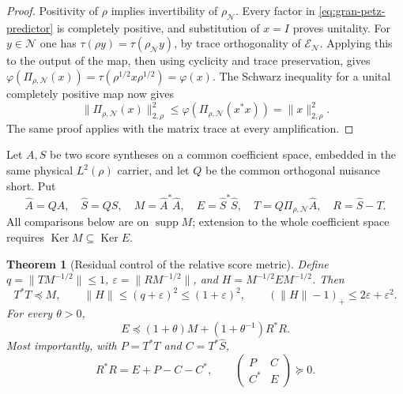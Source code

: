 \documentclass[11pt]{article}
\newtheorem{theorem}{Theorem}[section]
\theoremstyle{definition}
\theoremstyle{remark}
\newcommand{\C}{\mathbb C}
\newcommand{\Ker}{\operatorname{Ker}}
\newcommand{\supp}{\operatorname{supp}}
\begin{document}
\begin{proof}
Positivity of $\rho$ implies invertibility of
$\rho_{\mathcal N}$.  Every factor in
\eqref{eq:gran-petz-predictor} is completely positive, and substitution
of $x=I$ proves unitality.  For $y\in\mathcal N$ one has
$\tau(\rho y)=\tau(\rho_{\mathcal N}y)$, by trace orthogonality of
$\mathcal E_{\mathcal N}$.  Applying this to the output of the map,
then using cyclicity and trace preservation, gives
$\varphi(\Pi_{\rho,\mathcal N}(x))=\tau(\rho^{1/2}x\rho^{1/2})
=\varphi(x)$.
The Schwarz inequality for a unital completely positive map now gives
\[
 \|\Pi_{\rho,\mathcal N}(x)\|_{2,\rho}^2
 \le\varphi(\Pi_{\rho,\mathcal N}(x^*x))
 =\|x\|_{2,\rho}^2.
\]
The same proof applies with the matrix trace at every amplification.
\end{proof}

Let $A,S$ be two score syntheses on a common coefficient space, embedded
in the same physical $L^2(\rho)$ carrier, and let $Q$ be the common
orthogonal nuisance short.  Put
\begin{equation}
 \widehat A=QA,\quad \widehat S=QS,\quad
 M=\widehat A^*\widehat A,\quad E=\widehat S^*\widehat S,
 \quad T=Q\Pi_{\rho,\mathcal N}\widehat A,\quad
 R=\widehat S-T.
 \label{eq:gran-predictor-data}
\end{equation}
All comparisons below are on $\supp M$; extension to the whole
coefficient space requires $\Ker M\subseteq\Ker E$.

\begin{theorem}[Residual control of the relative score metric]
\label{thm:gran-predictor-bridge}
Define
$q=\|TM^{-1/2}\|\le1$,
$\varepsilon=\|RM^{-1/2}\|$, and $H=M^{-1/2}EM^{-1/2}$.
Then
\begin{equation}
 T^*T\preceq M,\qquad
 \|H\|\le(q+\varepsilon)^2\le(1+\varepsilon)^2,
 \qquad (\|H\|-1)_+\le2\varepsilon+\varepsilon^2.
 \label{eq:gran-predictor-bridge}
\end{equation}
For every $\theta>0$,
\begin{equation}
 E\preceq(1+\theta)M+(1+\theta^{-1})R^*R.
 \label{eq:gran-predictor-order}
\end{equation}
Most importantly, with $P=T^*T$ and $C=T^*\widehat S$,
\begin{equation}
 R^*R=E+P-C-C^*,\qquad
 \begin{pmatrix}P&C\\C^*&E\end{pmatrix}\succeq0.
 \label{eq:gran-predictor-mixed-gram}
\end{equation}
\end{theorem}
\end{document}
